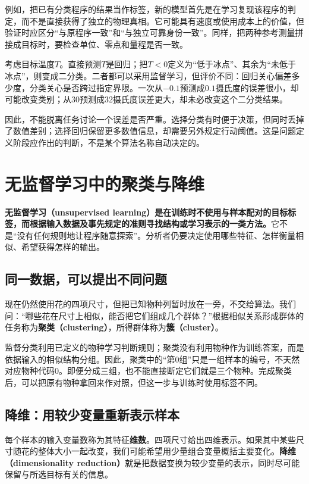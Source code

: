 例如，把已有分类程序的结果当作标签，新的模型首先是在学习复现该程序的判定，而不是直接获得了独立的物理真相。它可能具有速度或使用成本上的价值，但验证时应区分“与原程序一致”和“与独立可靠身份一致”。同样，把两种参考测量拼接成目标时，要检查单位、零点和量程是否一致。

考虑目标温度$T$。直接预测$T$是回归；把$T<0$定义为“低于冰点”、其余为“未低于冰点”，则变成二分类。二者都可以采用监督学习，但评价不同：回归关心偏差多少度，分类关心是否跨过指定界限。一次从$-0.1$预测成$0.1$摄氏度的误差很小，却可能改变类别；从30预测成32摄氏度误差更大，却未必改变这个二分类结果。

因此，不能脱离任务讨论一个误差是否严重。选择分类有时便于决策，但同时丢掉了数值差别；选择回归保留更多数值信息，却需要另外规定行动阈值。这是问题定义阶段应作出的判断，不是某个算法名称自动决定的。

\section{无监督学习中的聚类与降维}
\label{sec:unsupervised-definition}
\textbf{无监督学习（unsupervised learning）是在训练时不使用与样本配对的目标标签，而根据输入数据及事先规定的准则寻找结构或学习表示的一类方法。}它不是“没有任何规则地让程序随意探索”。分析者仍要决定使用哪些特征、怎样衡量相似、希望获得怎样的输出。

\subsection{同一数据，可以提出不同问题}
现在仍然使用花的四项尺寸，但把已知物种列暂时放在一旁，不交给算法。我们问：“哪些花在尺寸上相似，能否把它们组成几个群体？”根据相似关系形成群体的任务称为\textbf{聚类（clustering）}，所得群体称为\textbf{簇（cluster）}。

监督分类利用已定义的物种学习判断规则；聚类没有利用物种作为训练答案，而是依据输入的相似结构分组。因此，聚类中的“第0组”只是一组样本的编号，不天然对应物种代码0。即便分成三组，也不能直接断定它们就是三个物种。完成聚类后，可以把原有物种拿回来作对照，但这一步与训练时使用标签不同。

\subsection{降维：用较少变量重新表示样本}
每个样本的输入变量数称为其特征\textbf{维数}。四项尺寸给出四维表示。如果其中某些尺寸随花的整体大小一起改变，我们可能希望用少量组合变量概括主要变化。\textbf{降维（dimensionality reduction）}就是把数据变换为较少变量的表示，同时尽可能保留与所选目标有关的信息。


